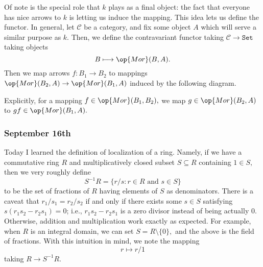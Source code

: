 Of note is the special role that $k$ plays as a final object: the fact that everyone has nice arrows to $k$ is letting us induce the mapping. This idea lets us define the functor. In general, let $\mathcal C$ be a category, and fix some object $A$ which will serve a similar purpose as $k.$ Then, we define the contravariant functor taking $\mathcal C\to\texttt{Set}$ taking objects
\[B\longmapsto\op{Mor}(B,A).\]
Then we map arrows $f:B_1\to B_2$ to mappings $\op{Mor}(B_2,A)\to\op{Mor}(B_1,A)$ induced by the following diagram.
\begin{center}
\end{center}
Explicitly, for a mapping $f\in\op{Mor}(B_1,B_2),$ we map $g\in\op{Mor}(B_2,A)$ to $gf\in\op{Mor}(B_1,A).$

\subsubsection{September 16th}
Today I learned the definition of localization of a ring. Namely, if we have a commutative ring $R$ and multiplicatively closed subset $S\subseteq R$ containing $1\in S,$ then we very roughly define
\[S^{-1}R=\{r/s:r\in R\text{ and }s\in S\}\]
to be the set of fractions of $R$ having elements of $S$ as denominators. There is a caveat that $r_1/s_1=r_2/s_2$ if and only if there exists some $s\in S$ satisfying $s(r_1s_2-r_2s_1)=0$; i.e., $r_1s_2-r_2s_1$ is a zero divisor instead of being actually $0.$ Otherwise, addition and multiplication work exactly as expected. For example, when $R$ is an integral domain, we can set $S=R\setminus\{0\},$ and the above is the field of fractions. With this intuition in mind, we note the mapping
\[r\longmapsto r/1\]
taking $R\to S^{-1}R.$

